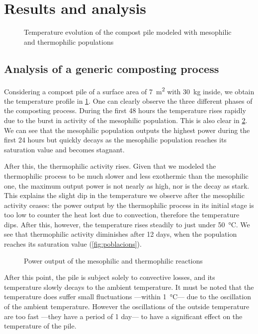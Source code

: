 \documentclass[12pt, a4paper, twocolumn, twoside]{article}
\numberwithin{table}{section}
\numberwithin{figure}{section}
\numberwithin{equation}{section}
\begin{document}
\section{Results and analysis}
\begin{figure}[htb]
	\sffamily \footnotesize \centering
	
	\caption{Temperature evolution of the compost pile modeled with mesophilic and thermophilic populations}
	\label{fig:temp-mesos-termos}
\end{figure}

\subsection{Analysis of a generic composting process}
Considering a compost pile of a surface area of \SI{7}{m^2} with \SI{30}{kg} inside, we obtain the temperature profile in \cref{fig:temp-mesos-termos}. One can clearly observe the three different phases of the composting process. During the first 48 hours the temperature rises rapidly due to the burst in activity of the mesophilic population. This is also clear in \cref{fig:potencies}. We can see that the mesophilic population outputs the highest power during the first 24 hours but quickly decays as the mesophilic population reaches its saturation value and becomes stagnant.

After this, the thermophilic activity rises. Given that we modeled the thermophilic process to be much slower and less exothermic than the mesophilic one, the maximum output power is not nearly as high, nor is the decay as stark. This explains the slight dip in the temperature we observe after the mesophilic activity ceases: the power output by the thermophilic process in its initial stage is too low to counter the heat lost due to convection, therefore the temperature dips. After this, however, the temperature rises steadily to just under \SI{50}{\celsius}. We see that thermophilic activity diminishes after 12 days, when the population reaches its saturation value (\cref{fig:poblacions}). 

\begin{figure}[htb]
	\sffamily \footnotesize \centering
	
	\caption{Power output of the mesophilic and thermophilic reactions}
	\label{fig:potencies}
\end{figure}

After this point, the pile is subject solely to convective losses, and its temperature slowly decays to the ambient temperature. It must be noted that the temperature does suffer small fluctuations ---within \SI{1}{\celsius}--- due to the oscillation of the ambient temperature. However the oscillations of the outside temperature are too fast ---they have a period of 1 day--- to have a significant effect on the temperature of the pile.  
\end{document}
